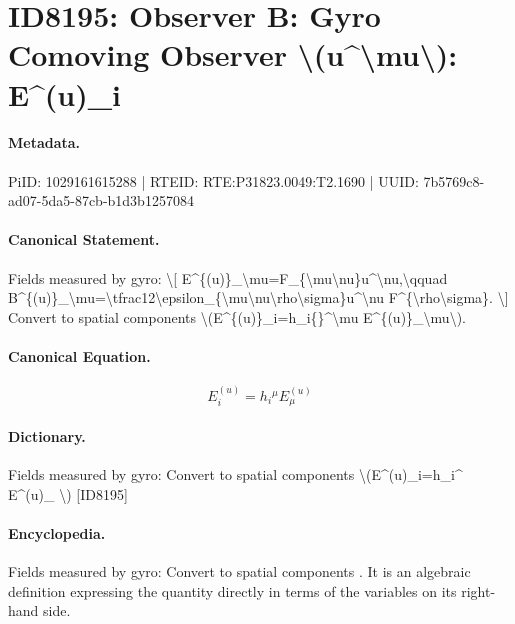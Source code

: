 \section*{ID8195: Observer B: Gyro Comoving Observer \textbackslash{}(u\textasciicircum{}\textbackslash{}mu\textbackslash{}): E\textasciicircum{}(u)\_i}
\paragraph{Metadata.}
PiID: 1029161615288 | RTEID: RTE:P31823.0049:T2.1690 | UUID: 7b5769c8-ad07-5da5-87cb-b1d3b1257084

\paragraph{Canonical Statement.}
Fields measured by gyro: \textbackslash{}[ E\textasciicircum{}\{(u)\}\_\textbackslash{}mu=F\_\{\textbackslash{}mu\textbackslash{}nu\}u\textasciicircum{}\textbackslash{}nu,\textbackslash{}qquad B\textasciicircum{}\{(u)\}\_\textbackslash{}mu=\textbackslash{}tfrac12\textbackslash{}epsilon\_\{\textbackslash{}mu\textbackslash{}nu\textbackslash{}rho\textbackslash{}sigma\}u\textasciicircum{}\textbackslash{}nu F\textasciicircum{}\{\textbackslash{}rho\textbackslash{}sigma\}. \textbackslash{}] Convert to spatial components \textbackslash{}(E\textasciicircum{}\{(u)\}\_i=h\_i\{\}\textasciicircum{}\textbackslash{}mu E\textasciicircum{}\{(u)\}\_\textbackslash{}mu\textbackslash{}).

\paragraph{Canonical Equation.}
\[
E^{(u)}_i=h_i{}^\mu E^{(u)}_\mu
\]

\paragraph{Dictionary.}
Fields measured by gyro: Convert to spatial components \textbackslash{}(E\textasciicircum{}(u)\_i=h\_i\textasciicircum{} E\textasciicircum{}(u)\_ \textbackslash{}) [ID8195]

\paragraph{Encyclopedia.}
Fields measured by gyro: Convert to spatial components . It is an algebraic definition expressing the quantity directly in terms of the variables on its right-hand side.
